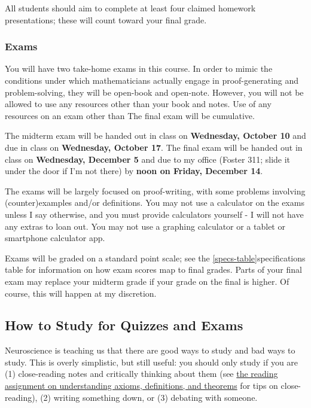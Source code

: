 \documentclass[11pt, a4paper]{article}
\begin{document}
All students should aim to complete at least four claimed homework presentations; these will count toward your final grade.


\subsubsection*{Exams} You will have two take-home exams in this course. In order to mimic the conditions under which mathematicians actually engage in proof-generating and problem-solving, they will be open-book and open-note. However, you will not be allowed to use any resources other than your book and notes. Use of any resources on an exam other than  The final exam will be cumulative.

The midterm exam will be handed out in class on \textbf{Wednesday, October 10} and due in class on \textbf{Wednesday, October 17}. The final exam will be handed out in class on \textbf{Wednesday, December 5} and due to my office (Foster 311; slide it under the door if I'm not there) by \textbf{noon on Friday, December 14}. 

The exams will be largely focused on proof-writing, with some problems involving (counter)examples and/or definitions. You may not use a calculator on the exams unless I say otherwise, and you must provide calculators yourself - I will not have any extras to loan out. You may not use a graphing calculator or a tablet or smartphone calculator app.

Exams will be graded on a standard point scale; see the \ref{specs-table}{specifications table} for information on how exam scores map to final grades. Parts of your final exam may replace your midterm grade if your grade on the final is higher. Of course, this will happen at my discretion.

\subsection*{How to Study for Quizzes and Exams} Neuroscience is teaching us that there are good ways to study and bad ways to study. This is overly simplistic, but still useful: you should only study if you are (1) close-reading notes and critically thinking about them (see \href{https://westminster.instructure.com/courses/2138151/assignments/13449735?module_item_id=29562061}{the reading assignment on understanding axioms, definitions, and theorems} for tips on close-reading), (2) writing something down, or (3) debating with someone.
\end{document}
